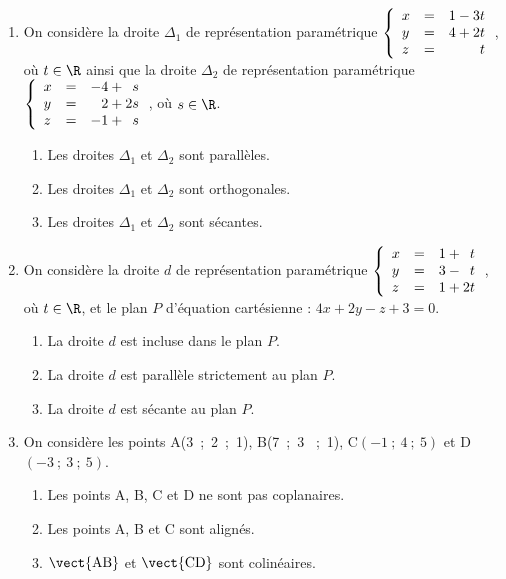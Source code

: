 \begin{enumerate}
\item On considère la droite $\Delta_1$ de représentation paramétrique 
$\left\{\begin{array}{l c l}
x &=& 1 - 3t\\
y &=& 4 + 2t\\
z &=&\phantom{4 +2}t
\end{array}\right.$, où $t \in  \R$
ainsi que la droite $\Delta_2$ de représentation paramétrique 
$\left\{\begin{array}{l c l}
x& =& -4 + \phantom{2}s\\
y& =& \phantom{-}2 + 2s\\
z& =& - 1 + \phantom{2}s
\end{array}\right.$, où $s \in \R$.
\begin{enumerate}
\item Les droites $\Delta_1$ et $\Delta_2$ sont parallèles.
\item Les droites $\Delta_1$ et $\Delta_2$ sont orthogonales.
\item Les droites $\Delta_1$ et $\Delta_2$ sont sécantes.
\end{enumerate}
\item On considère la droite $d$ de représentation paramétrique $\left\{\begin{array}{l c l}x&=&1 + \phantom{2}t\\
y &=& 3 - \phantom{2}t\\
z &=& 1 + 2t
\end{array}\right.$, où $t \in \R$,
et le plan $P$ d'équation cartésienne : $4x + 2y - z + 3 = 0.$
	\begin{enumerate}
		\item La droite $d$ est incluse dans le plan $P$.
		\item La droite $d$ est parallèle strictement au plan $P$.
		\item La droite $d$ est sécante au plan $P$.
	\end{enumerate}
\item On considère les points A(3~;~2~;~1), B(7~;~3 ~;~1), C$(-1~;~4~;~5)$ et D$(- 3~;~3~;~5)$.
	\begin{enumerate}
		\item Les points A, B, C et D ne sont pas coplanaires.
		\item Les points A, B et C sont alignés.
		\item $\vect{\text{AB}}$ et $\vect{\text{CD}}$ sont colinéaires.
	\end{enumerate}

\end{enumerate}
